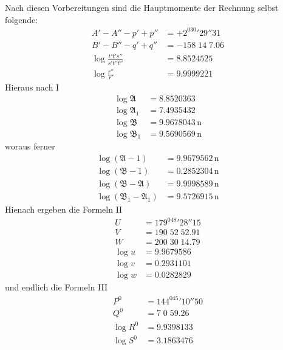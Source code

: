 Nach diesen Vorbereitungen sind die Hauptmomente der Rechnung selbst folgende:
\[
\begin{aligned}
A'-A''-p'+p''&=+2^030'29''31\\
B'-B''-q'+q''&=-158\;14\;7.06\\
\log\frac{t't's''}{s't''t''}&=8.8524525\\
\log\frac{r''}{r'}&=9.9999221
\end{aligned}
\]
Hieraus nach I
\[
\begin{aligned}
\log\mathfrak{A}&=8.8520363\\
\log\mathfrak{A}_1&=7.4935432\\
\log\mathfrak{B}&=9.9678043\,\mathrm{n}\\
\log\mathfrak{B}_1&=9.5690569\,\mathrm{n}
\end{aligned}
\]
woraus ferner
\[
\begin{aligned}
\log(\mathfrak{A}-1)&=9.9679562\,\mathrm{n}\\
\log(\mathfrak{B}-1)&=0.2852304\,\mathrm{n}\\
\log(\mathfrak{B}-\mathfrak{A})&=9.9998589\,\mathrm{n}\\
\log(\mathfrak{B}_1-\mathfrak{A}_1)&=9.5726915\,\mathrm{n}
\end{aligned}
\]
Hienach ergeben die Formeln II
\[
\begin{aligned}
U&=179^048'28''15\\
V&=190\;52\;52.91\\
W&=200\;30\;14.79\\
\log u&=9.9679586\\
\log v&=0.2931101\\
\log w&=0.0282829
\end{aligned}
\]
und endlich die Formeln III
\[
\begin{aligned}
P^0&=144^045'10''50\\
Q^0&=7\;0\;59.26\\
\log R^0&=9.9398133\\
\log S^0&=3.1863476
\end{aligned}
\]

